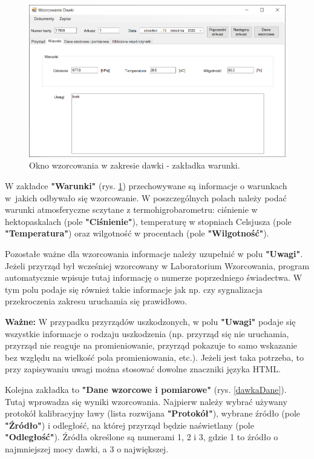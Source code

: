\begin{figure}[htb]
	\centering
	\includegraphics[width=\columnwidth]{obrazki/Wzorcowanie/dawka/warunki.png}
	\caption{Okno wzorcowania w zakresie dawki - zakładka warunki.}
	\label{dawkaWarunki}
\end{figure}

W zakładce \textbf{"Warunki"} (rys. \ref{dawkaWarunki}) przechowywane są informacje o warunkach w~jakich odbywało się wzorcowanie. W poszczególnych polach należy podać warunki atmosferyczne sczytane z termohigrobarometru: ciśnienie w hektopaskalach (pole \textbf{"Ciśnienie"}), temperaturę w stopniach Celsjusza (pole \textbf{"Temperatura"}) oraz wilgotność w procentach (pole \textbf{"Wilgotność"}).

Pozostałe ważne dla wzorcowania informacje należy uzupełnić w polu \textbf{"Uwagi"}. Jeżeli przyrząd był wcześniej wzorcowany w Laboratorium Wzorcowania, program automatycznie wpisuje tutaj informację o numerze poprzedniego świadectwa. W tym polu podaje się również takie informacje jak np. czy sygnalizacja przekroczenia zakresu uruchamia się prawidłowo. 

\textbf{Ważne:} W przypadku przyrządów uszkodzonych, w polu \textbf{"Uwagi"} podaje się wszystkie informacje o rodzaju uszkodzenia (np. przyrząd się nie uruchamia, przyrząd nie reaguje na promieniowanie, przyrząd pokazuje to samo wskazanie bez względu na wielkość pola promieniowania, etc.). Jeżeli jest taka potrzeba, to przy zapisywaniu uwagi można stosować dowolne znaczniki języka HTML.

Kolejna zakładka to \textbf{"Dane wzorcowe i pomiarowe"} (rys. \ref{dawkaDane}). Tutaj wprowadza się wyniki wzorcowania. Najpierw należy wybrać używany protokół kalibracyjny ławy (lista rozwijana \textbf{"Protokół"}), wybrane źródło (pole \textbf{"Źródło"}) i odległość, na której przyrząd będzie naświetlany (pole \textbf{"Odległość"}). Źródła określone są numerami 1, 2 i 3, gdzie 1 to źródło o najmniejszej mocy dawki, a 3 o największej.

